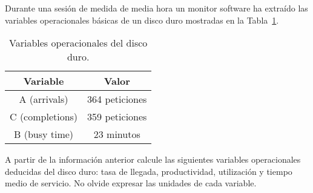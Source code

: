 \begin{ejercicio}\label{ej:5.4}
    Durante una sesión de medida de media hora un monitor software ha extraído las variables operacionales básicas de un disco duro mostradas en la Tabla~\ref{tab:5.4}.
    \begin{table}[h]
        \centering
        \begin{tabular}{|c|c|}
            \hline
            Variable & Valor \\
            \hline
            A (arrivals) & 364 peticiones \\
            C (completions) & 359 peticiones \\
            B (busy time) & 23 minutos \\
            \hline
        \end{tabular}
        \caption{Variables operacionales del disco duro.}
        \label{tab:5.4}
    \end{table}
    A partir de la información anterior calcule las siguientes variables operacionales deducidas del disco duro: tasa de llegada, productividad, utilización y tiempo medio de servicio. No olvide expresar las unidades de cada variable.
\end{ejercicio}
\begin{comment}
\solucion
    \begin{itemize}
        \item $\lambda = 12.13$ peticiones/minuto
        \item $X = 11.97$ peticiones/minuto
        \item $U = 0.77$
        \item $S = 3.84$ segundos/petición
    \end{itemize}
\end{comment}

